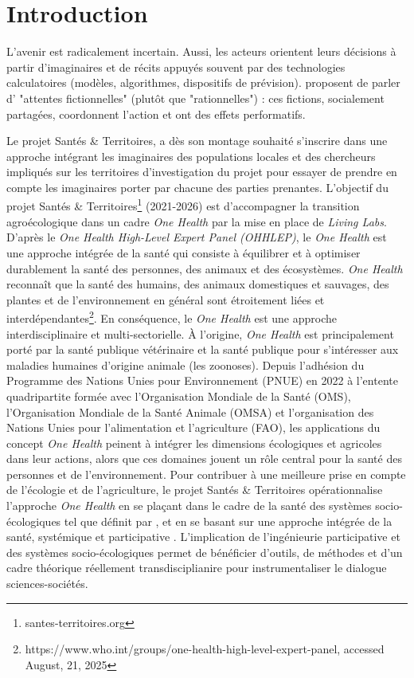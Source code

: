 \documentclass{article}
\begin{document}
\section{Introduction}

L'avenir est radicalement incertain. Aussi, les acteurs orientent leurs décisions à partir d'imaginaires et de récits appuyés souvent par des technologies calculatoires (modèles, algorithmes, dispositifs de prévision). \textcite{beckert_uncertain_2018} proposent de parler d' "attentes fictionnelles" (plutôt que "rationnelles") : ces fictions, socialement partagées, coordonnent l'action et ont des effets performatifs.

Le projet Santés \& Territoires, a dès son montage souhaité s'inscrire dans une approche intégrant les imaginaires des populations locales et des chercheurs impliqués sur les territoires d'investigation du projet pour essayer de prendre en compte les imaginaires porter par chacune des parties prenantes.  L'objectif du projet Santés \& Territoires\footnote{santes-territoires.org} (2021-2026) est d'accompagner la transition agroécologique dans un cadre \textit{One Health} par la mise en place de \textit{Living Labs}. D'après le \textit{One Health High-Level Expert Panel (OHHLEP)}, le \textit{One Health} est une approche intégrée de la santé qui consiste à équilibrer et à optimiser durablement la santé des personnes, des animaux et des écosystèmes. \textit{One Health} reconnaît que la santé des humains, des animaux domestiques et sauvages, des plantes et de l'environnement en général sont étroitement liées et interdépendantes\footnote{https://www.who.int/groups/one-health-high-level-expert-panel, accessed August, 21, 2025}. En conséquence, le \textit{One Health} est une approche interdisciplinaire et multi-sectorielle. À l'origine, \textit{One Health} est principalement porté par la santé publique vétérinaire et la santé publique pour s'intéresser aux maladies humaines d'origine animale (les zoonoses). Depuis l'adhésion du Programme des Nations Unies pour Environnement (PNUE) en 2022 à l'entente quadripartite formée avec l'Organisation Mondiale de la Santé (OMS), l'Organisation Mondiale de la Santé Animale (OMSA) et l'organisation des Nations Unies pour l'alimentation et l'agriculture (FAO), les applications du concept \textit{One Health} peinent à intégrer les dimensions écologiques et agricoles dans leur actions, alors que ces domaines jouent un rôle central pour la santé des personnes et de l'environnement. Pour contribuer à une meilleure prise en compte de l'écologie et de l'agriculture, le projet Santés \& Territoires opérationnalise l'approche \textit{One Health} en se plaçant dans le cadre de la santé des systèmes socio-écologiques tel que définit par \textcite{de_garine-wichatitsky_health_2021}, et en se basant sur une approche intégrée de la santé, systémique et participative \parencite{duboz_systems_2018}. L'implication de l'ingénieurie participative et des systèmes socio-écologiques permet de bénéficier d'outils, de méthodes et d'un cadre théorique réellement transdisciplianire pour instrumentaliser le dialogue sciences-sociétés.
\end{document}
